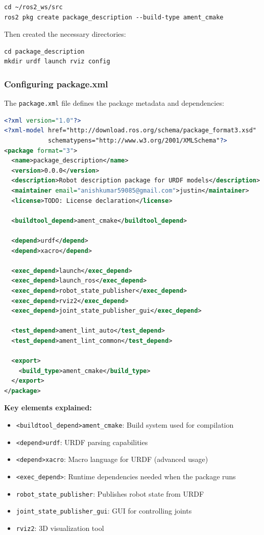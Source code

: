 \begin{verbatim}
cd ~/ros2_ws/src
ros2 pkg create package_description --build-type ament_cmake
\end{verbatim}

Then created the necessary directories:
\begin{verbatim}
cd package_description
mkdir urdf launch rviz config
\end{verbatim}

\subsubsection{Configuring package.xml}

The \texttt{package.xml} file defines the package metadata and dependencies:

\begin{lstlisting}[language=XML]
<?xml version="1.0"?>
<?xml-model href="http://download.ros.org/schema/package_format3.xsd" 
            schematypens="http://www.w3.org/2001/XMLSchema"?>
<package format="3">
  <name>package_description</name>
  <version>0.0.0</version>
  <description>Robot description package for URDF models</description>
  <maintainer email="anishkumar59085@gmail.com">justin</maintainer>
  <license>TODO: License declaration</license>
  
  <buildtool_depend>ament_cmake</buildtool_depend>
  
  <depend>urdf</depend>
  <depend>xacro</depend>
  
  <exec_depend>launch</exec_depend>
  <exec_depend>launch_ros</exec_depend>
  <exec_depend>robot_state_publisher</exec_depend>
  <exec_depend>rviz2</exec_depend>
  <exec_depend>joint_state_publisher_gui</exec_depend>
  
  <test_depend>ament_lint_auto</test_depend>
  <test_depend>ament_lint_common</test_depend>
  
  <export>
    <build_type>ament_cmake</build_type>
  </export>
</package>
\end{lstlisting}

\textbf{Key elements explained:}
\begin{itemize}
	\item \texttt{<buildtool\_depend>ament\_cmake}: Build system used for compilation
	\item \texttt{<depend>urdf}: URDF parsing capabilities
	\item \texttt{<depend>xacro}: Macro language for URDF (advanced usage)
	\item \texttt{<exec\_depend>}: Runtime dependencies needed when the package runs
	\item \texttt{robot\_state\_publisher}: Publishes robot state from URDF
	\item \texttt{joint\_state\_publisher\_gui}: GUI for controlling joints
	\item \texttt{rviz2}: 3D visualization tool
\end{itemize}

